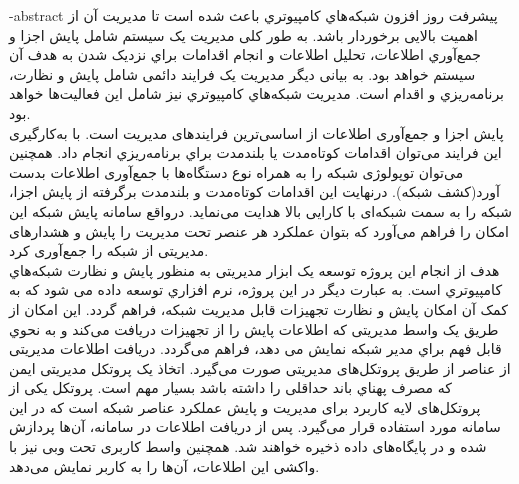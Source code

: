 
\fa-abstract{
    پیشرفت روز افزون شبکه‌هاي کامپیوتري باعث شده است تا مدیریت آن از اهمیت بالایی برخوردار باشد. به طور کلی مدیریت یک سیستم شامل پایش اجزا و جمع‌آوري اطلاعات، تحلیل اطلاعات و انجام اقدامات براي نزدیک شدن به هدف آن سیستم خواهد بود. به بیانی دیگر مدیریت یک فرایند دائمی شامل پایش و نظارت، برنامه‌ریزي و اقدام است. مدیریت شبکه‌هاي کامپیوتري نیز شامل این فعالیت‌ها خواهد بود.
    \\
    پایش اجزا و جمع‌آوری اطلاعات از اساسی‌ترین فرایندهای مدیریت است. با به‌کارگیری این فرایند می‌توان اقدامات کوتاه‌مدت یا بلندمدت براي برنامه‌ریزي انجام داد. همچنین می‌توان توپولوژی شبکه را به همراه نوع دستگاه‌ها با جمع‌آوری اطلاعات بدست آورد(کشف شبکه). درنهایت این اقدامات کوتاه‌مدت و بلندمدت برگرفته از پایش اجزا، شبکه را به سمت شبکه‌ای با کارایی بالا هدایت می‌نماید. درواقع سامانه پایش شبکه این امکان را فراهم می‌آورد که بتوان عملکرد هر عنصر تحت مدیریت را پایش و هشدارهای مدیریتی از شبکه را جمع‌آوری کرد.
    \\
    هدف از انجام این پروژه توسعه یک ابزار مدیریتی به منظور پایش و نظارت شبکه‌هاي کامپیوتري است. به عبارت دیگر در این پروژه، نرم افزاري توسعه داده می شود که به کمک آن امکان پایش و نظارت تجهیزات قابل مدیریت شبکه، فراهم گردد. این امکان از طریق یک واسط مدیریتی که اطلاعات پایش را از تجهیزات دریافت می‌کند و به نحوي قابل فهم براي مدیر شبکه نمایش می دهد، فراهم می‌گردد. دریافت اطلاعات مدیریتی از عناصر از طریق پروتکل‌های مدیریتی صورت می‌گیرد. اتخاذ یک پروتکل مدیریتی ایمن که مصرف پهناي باند حداقلی را داشته باشد بسیار مهم است. پروتکل  یکی از پروتکل‌های لایه کاربرد برای مدیریت و پایش عملکرد عناصر شبکه است که در این سامانه مورد استفاده قرار می‌گیرد. پس از دریافت اطلاعات در سامانه، آن‌ها پردازش شده و در پایگاه‌های داده ذخیره خواهند شد. همچنین واسط کاربری تحت وبی نیز با واکشی این اطلاعات، آن‌ها را به کاربر نمایش می‌دهد.}


